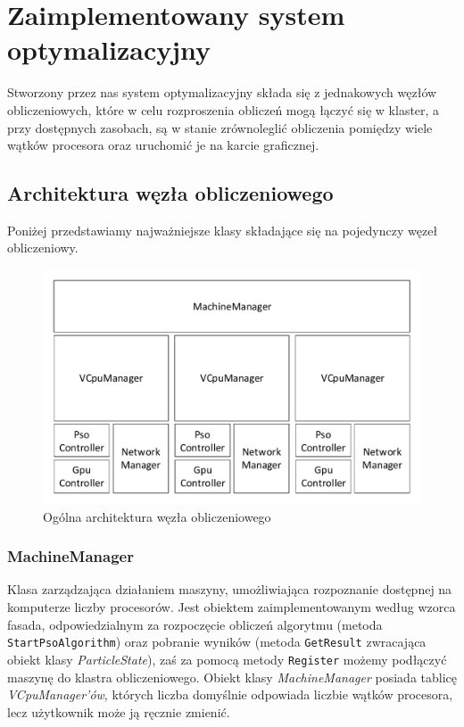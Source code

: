 \documentclass[12pt, twoside, openany, abstract=on]{report}
\theoremstyle{definition}
\begin{document}

\chapter{Zaimplementowany system optymalizacyjny}

Stworzony przez nas system optymalizacyjny składa się z jednakowych węzłów obliczeniowych, które w celu rozproszenia obliczeń mogą łączyć się w klaster, a przy dostępnych zasobach, są w stanie zrównoleglić obliczenia pomiędzy wiele wątków procesora oraz uruchomić je na karcie graficznej.


\section{Architektura węzła obliczeniowego}

Poniżej przedstawiamy najważniejsze klasy składające się na pojedynczy węzeł obliczeniowy. 

\begin{figure}[H]
    \centering
    \includegraphics[scale=0.7]{WezlaArch.pdf} 
 \caption{Ogólna architektura węzła obliczeniowego}
\end{figure}

\subsection{MachineManager}
Klasa zarządzająca działaniem maszyny, umożliwiająca rozpoznanie dostępnej na komputerze liczby procesorów. Jest obiektem zaimplementowanym według wzorca fasada, odpowiedzialnym za rozpoczęcie obliczeń algorytmu (metoda \texttt{StartPsoAlgorithm}) oraz pobranie wyników (metoda \texttt{GetResult} zwracająca obiekt klasy \textit{ParticleState}), zaś za pomocą metody \texttt{Register} możemy podłączyć maszynę do klastra obliczeniowego. Obiekt klasy \textit{MachineManager} posiada tablicę \textit{VCpuManager'ów}, których liczba domyślnie odpowiada liczbie wątków procesora, lecz użytkownik może ją ręcznie zmienić.
\end{document}
